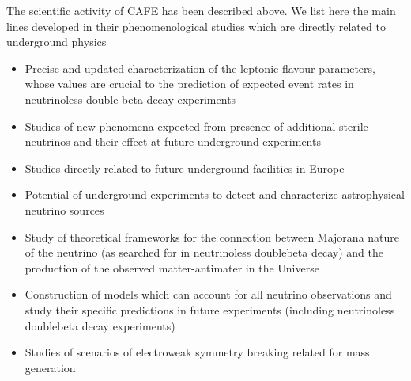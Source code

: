 The scientific activity of CAFE has been described above. We list
here the main lines developed in their phenomenological studies
which are directly related to underground physics
\begin{itemize}
\item Precise and updated characterization of the leptonic flavour
parameters, whose values are crucial to the prediction of expected
event rates in neutrinoless double beta decay experiments
\cite{Song:2015xaa,Bergstrom:2015rba,Gonzalez-Garcia:2014bfa,Gonzalez-Garcia:2013usa,GonzalezGarcia:2012sz,GonzalezGarcia:2011my,GonzalezGarcia:2010un,GonzalezGarcia:2010er}
\item Studies of new phenomena expected from presence of additional
sterile neutrinos and their effect at future underground experiments
\cite{Vincent:2014rja,Bergstrom:2014fqa,Adey:2014rfv,GonzalezGarcia:2012yq,SolagurenBeascoa:2012cz,Donini:2011jh,Abazajian:2012ys}
\item Studies directly related to future underground facilities
in Europe 
\cite{Bross:2013oua,Edgecock:2013lga,Blennow:2013swa,Bayes:2012ex,Agarwalla:2012zu,Hernandez:2012zz,Coloma:2012wq,Coloma:2011rq,Donini:2010xk,Coloma:2010wa,Choubey:2009ks,Bandyopadhyay:2007kx}
\item Potential of underground experiments to detect and 
characterize astrophysical neutrino sources 
\cite{Bergstrom:2016cbh,Gonzalez-Garcia:2013iha,Ahlers:2011jj,Ahlers:2010fw,GonzalezGarcia:2009ya,GonzalezGarcia:2009jc}
\item Study of theoretical frameworks for the connection  between Majorana 
nature of the neutrino (as searched for
in neutrinoless doublebeta decay) and the production of the
observed matter-antimater in the Universe
\cite{Hernandez:2015wna,Fong:2013gaa,Fong:2011yx,Fong:2010bv,Fong:2010bh,Fong:2010qh,Fong:2010zu,GonzalezGarcia:2009qd,Fong:2009iu}
\item Construction of models which can account for all neutrino observations
and study their specific predictions in future experiments
(including neutrinoless doublebeta decay experiments)
\cite{Gago:2015vma,Hernandez:2014fha,Hernandez:2013lza,Donini:2012tt,Eboli:2011ia,Gavela:2009cd}
\item Studies of scenarios of electroweak symmetry breaking related
for mass generation
\cite{Corbett:2015lfa,Corbett:2014ora,Gavela:2014vra,Brivio:2014pfa,Brivio:2013pma,Corbett:2013pja,Corbett:2012ja,Corbett:2012dm,Eboli:2011ye,Eboli:2011bq,Eboli:2010qd,Alves:2009aa}
\end{itemize}
%
